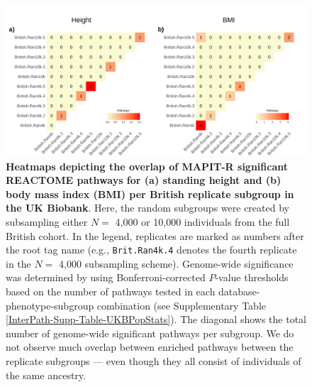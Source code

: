 \documentclass[10pt]{article}
\begin{document}
\begin{landscape}
\begin{figure}[htbp]
\centering
\includegraphics[scale=.2]{Images/Supp/InterPath_Supp_Figure_BritReps_Heatplots_REACTOME_vs4.png}
\caption{\textbf{Heatmaps depicting the overlap of MAPIT-R significant REACTOME pathways for (a) standing height and (b) body mass index (BMI) per British replicate subgroup in the UK Biobank}. Here, the random subgroups were created by subsampling either $N =$ 4,000 or 10,000 individuals from the full British cohort. In the legend, replicates are marked as numbers after the root tag name (e.g., \texttt{Brit.Ran4k.4} denotes the fourth replicate in the $N =$ 4,000 subsampling scheme). Genome-wide significance was determined by using Bonferroni-corrected $P$-value thresholds based on the number of pathways tested in each database-phenotype-subgroup combination (see Supplementary Table \ref{InterPath-Supp-Table-UKBPopStats}). The diagonal shows the total number of genome-wide significant pathways per subgroup. We do not observe much overlap between enriched pathways between the replicate subgroups --- even though they all consist of individuals of the same ancestry.}
\label{InterPath-Supp-Figure-BritReps-Heatplots-AllPaths-REACTOME}
\end{figure}
\clearpage
\end{landscape}
\end{document}
